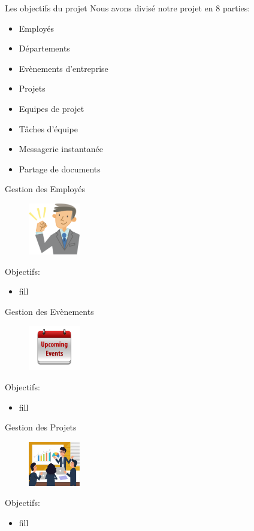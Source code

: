 \begin{frame}{Les objectifs du projet}
 Nous avons divisé notre projet en 8 parties:
  \begin{itemize}
  \item Employés
\item Départements
 \item Evènements d'entreprise
 \item Projets
 \item Equipes de projet
 \item Tâches d'équipe
  \item Messagerie instantanée
\item Partage de documents
    \end{itemize}
\end{frame}

\begin{frame}{Gestion des Employés}
\begin{figure}[h!]
  \includegraphics[width=0.2\textwidth]{images/employee}
\end{figure}
Objectifs:
  \begin{itemize}
\item fill
    \end{itemize}
\end{frame}

\begin{frame}{Gestion des Evènements}
\begin{figure}[h!]
  \includegraphics[width=0.20\textwidth]{images/Event}
\end{figure}
Objectifs:
  \begin{itemize}
\item fill
    \end{itemize}
\end{frame}


\begin{frame}{Gestion des Projets}
\begin{figure}[h!]
  \includegraphics[width=0.20\textwidth]{images/manager_work_background_colleagues_meeting_icons_cartoon_characters_6836720}
\end{figure}
Objectifs:
  \begin{itemize}
\item fill
    \end{itemize}
\end{frame}

